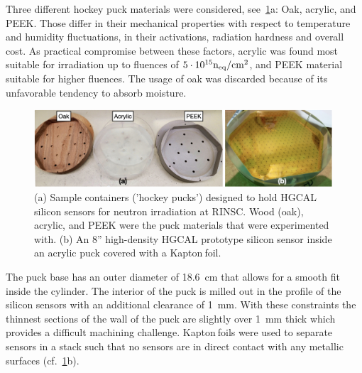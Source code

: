 Three different hockey puck materials were considered, see~\ref{fig:Pucks_Arrayed}a: Oak, acrylic, and PEEK. 
Those differ in their mechanical properties with respect to temperature and humidity fluctuations, in their activations, radiation hardness and overall cost.
As practical compromise between these factors, acrylic was found most suitable for irradiation up to fluences of $5\cdot 10^{15}\mathrm{n_{eq}}/\mathrm{cm}^{2}$, and PEEK material suitable for higher fluences. 
The usage of oak was discarded because of its unfavorable tendency to absorb moisture.
\begin{figure}
  \begin{center}
    \includegraphics[width=0.99\textwidth]{figures/figures_edited_002.jpeg}
    \caption{(a) Sample containers ('hockey pucks') designed to hold HGCAL silicon sensors for neutron irradiation at RINSC. 
    Wood (oak), acrylic, and PEEK were the puck materials that were experimented with.
    (b) An 8'' high-density HGCAL prototype silicon sensor inside an acrylic puck covered with a Kapton\texttrademark$~$foil.}
    \label{fig:Pucks_Arrayed}
  \end{center}
\end{figure}
The puck base has an outer diameter of \SI{18.6}{\centi\metre} that allows for a smooth fit inside the cylinder. 
The interior of the puck is milled out in the profile of the silicon sensors with an additional clearance of \SI{1}{\milli\metre}. 
With these constraints the thinnest sections of the wall of the puck are slightly over \SI{1}{\milli\metre} thick which provides a difficult machining challenge.
Kapton\texttrademark$~$foils were used to separate sensors in a stack such that no sensors are in direct contact with any metallic surfaces (cf.~\ref{fig:Pucks_Arrayed}b).
